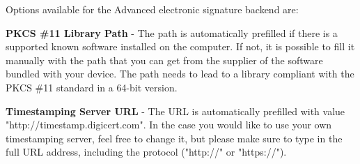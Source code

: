 \documentclass[thesismargins, english, thesislinespacing, onelinechapterstyle, upjsfrontpage]{rnthesis}
\begin{document}
Options available for the Advanced electronic signature backend are:

\textbf{PKCS \#11 Library Path} - The path is automatically prefilled if there is a supported known software installed on the computer. If not, it is possible to fill it manually with the path that you can get from the supplier of the software bundled with your device. The path needs to lead to a library compliant with the PKCS \#11 standard in a 64-bit version.

\textbf{Timestamping Server URL} - The URL is automatically prefilled with value "http://timestamp.digicert.com". In the case you would like to use your own timestamping server, feel free to change it, but please make sure to type in the full URL address, including the protocol ("http://" or "https://").
\end{document}

